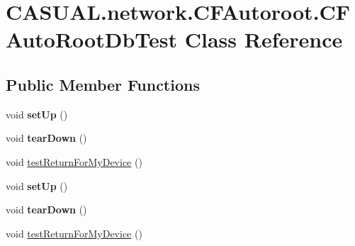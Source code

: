 \hypertarget{class_c_a_s_u_a_l_1_1network_1_1_c_f_autoroot_1_1_c_f_auto_root_db_test}{\section{C\-A\-S\-U\-A\-L.\-network.\-C\-F\-Autoroot.\-C\-F\-Auto\-Root\-Db\-Test Class Reference}
\label{class_c_a_s_u_a_l_1_1network_1_1_c_f_autoroot_1_1_c_f_auto_root_db_test}
}
\subsection*{Public Member Functions}
\begin{DoxyCompactItemize}
\item 
\hypertarget{class_c_a_s_u_a_l_1_1network_1_1_c_f_autoroot_1_1_c_f_auto_root_db_test_a11d8d12096300b7f2543d6299246f6f8}{void {\bfseries set\-Up} ()}\label{class_c_a_s_u_a_l_1_1network_1_1_c_f_autoroot_1_1_c_f_auto_root_db_test_a11d8d12096300b7f2543d6299246f6f8}

\item 
\hypertarget{class_c_a_s_u_a_l_1_1network_1_1_c_f_autoroot_1_1_c_f_auto_root_db_test_a70bd64859e68018964674d4a7b8fe66e}{void {\bfseries tear\-Down} ()}\label{class_c_a_s_u_a_l_1_1network_1_1_c_f_autoroot_1_1_c_f_auto_root_db_test_a70bd64859e68018964674d4a7b8fe66e}

\item 
void \hyperlink{class_c_a_s_u_a_l_1_1network_1_1_c_f_autoroot_1_1_c_f_auto_root_db_test_a45ed8030ea4361f9960b0f50ebfed09e}{test\-Return\-For\-My\-Device} ()
\item 
\hypertarget{class_c_a_s_u_a_l_1_1network_1_1_c_f_autoroot_1_1_c_f_auto_root_db_test_a11d8d12096300b7f2543d6299246f6f8}{void {\bfseries set\-Up} ()}\label{class_c_a_s_u_a_l_1_1network_1_1_c_f_autoroot_1_1_c_f_auto_root_db_test_a11d8d12096300b7f2543d6299246f6f8}

\item 
\hypertarget{class_c_a_s_u_a_l_1_1network_1_1_c_f_autoroot_1_1_c_f_auto_root_db_test_a70bd64859e68018964674d4a7b8fe66e}{void {\bfseries tear\-Down} ()}\label{class_c_a_s_u_a_l_1_1network_1_1_c_f_autoroot_1_1_c_f_auto_root_db_test_a70bd64859e68018964674d4a7b8fe66e}

\item 
void \hyperlink{class_c_a_s_u_a_l_1_1network_1_1_c_f_autoroot_1_1_c_f_auto_root_db_test_a45ed8030ea4361f9960b0f50ebfed09e}{test\-Return\-For\-My\-Device} ()
\end{DoxyCompactItemize}
